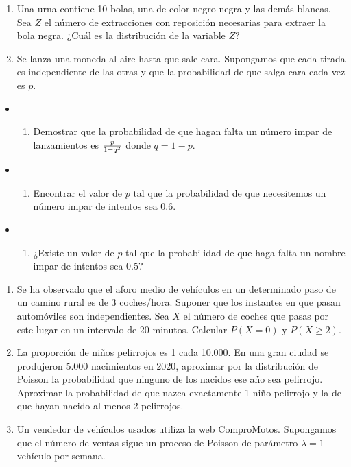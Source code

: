 \documentclass[
]{article}
\providecommand{\tightlist}{%
  \setlength{\itemsep}{0pt}\setlength{\parskip}{0pt}}
\begin{document}
\begin{enumerate}
\def\labelenumi{\arabic{enumi}.}
\setcounter{enumi}{3}
\item
  Una urna contiene 10 bolas, una de color negro negra y las demás
  blancas. Sea \(Z\) el número de extracciones con reposición necesarias
  para extraer la bola negra. ¿Cuál es la distribución de la variable
  \(Z\)?
\item
  Se lanza una moneda al aire hasta que sale cara. Supongamos que cada
  tirada es independiente de las otras y que la probabilidad de que
  salga cara cada vez es \(p\).\\
\end{enumerate}

\begin{itemize}
\item
  \begin{enumerate}
  \def\labelenumi{\alph{enumi})}
  \tightlist
  \item
    Demostrar que la probabilidad de que hagan falta un número impar de
    lanzamientos es \({p\over 1-q^2}\) donde \(q=1-p\).
  \end{enumerate}
\item
  \begin{enumerate}
  \def\labelenumi{\alph{enumi})}
  \setcounter{enumi}{1}
  \tightlist
  \item
    Encontrar el valor de \(p\) tal que la probabilidad de que
    necesitemos un número impar de intentos sea \(0.6\).
  \end{enumerate}
\item
  \begin{enumerate}
  \def\labelenumi{\alph{enumi})}
  \setcounter{enumi}{2}
  \tightlist
  \item
    ¿Existe un valor de \(p\) tal que la probabilidad de que haga falta
    un nombre impar de intentos sea \(0.5\)?
  \end{enumerate}
\end{itemize}

\begin{enumerate}
\def\labelenumi{\arabic{enumi}.}
\setcounter{enumi}{5}
\item
  Se ha observado que el aforo medio de vehículos en un determinado paso
  de un camino rural es de 3 coches/hora. Suponer que los instantes en
  que pasan automóviles son independientes. Sea \(X\) el número de
  coches que pasas por este lugar en un intervalo de 20 minutos.
  Calcular \(P(X=0)\) y \(P(X\geq 2)\).
\item
  La proporción de niños pelirrojos es 1 cada 10.000. En una gran ciudad
  se produjeron 5.000 nacimientos en 2020, aproximar por la distribución
  de Poisson la probabilidad que ninguno de los nacidos ese año sea
  pelirrojo. Aproximar la probabilidad de que nazca exactamente 1 niño
  pelirrojo y la de que hayan nacido al menos 2 pelirrojos.
\item
  Un vendedor de vehículos usados utiliza la web ComproMotos. Supongamos
  que el número de ventas sigue un proceso de Poisson de parámetro
  \(\lambda =1\) vehículo por semana.
\end{enumerate}
\end{document}
